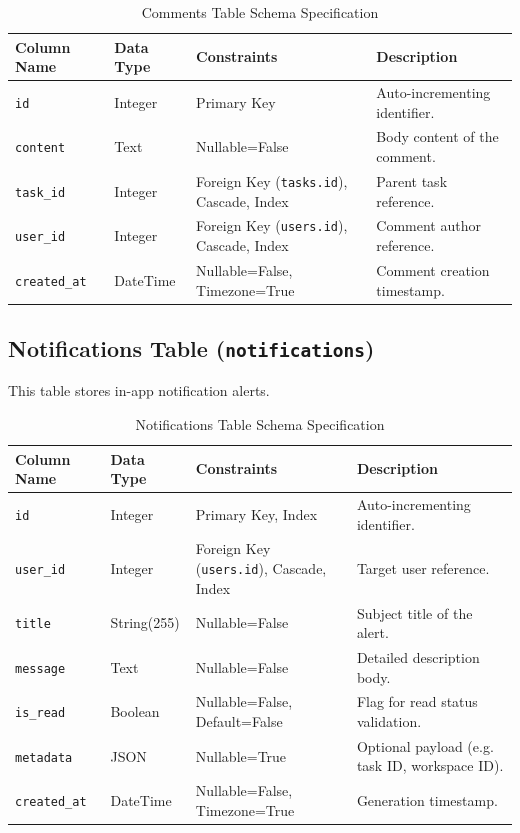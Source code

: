 \begin{table}[h!]
\centering
\small
\renewcommand{\arraystretch}{1.4}
\begin{tabularx}{\textwidth}{l l l X}
    \toprule[1.5pt]
    \rowcolor{primary!5}
    \textbf{\color{primary}Column Name} & \textbf{\color{primary}Data Type} & \textbf{\color{primary}Constraints} & \textbf{\color{primary}Description} \\
    \midrule
    \texttt{id} & Integer & Primary Key & Auto-incrementing identifier. \\
    \texttt{content} & Text & Nullable=False & Body content of the comment. \\
    \texttt{task\_id} & Integer & Foreign Key (\texttt{tasks.id}), Cascade, Index & Parent task reference. \\
    \texttt{user\_id} & Integer & Foreign Key (\texttt{users.id}), Cascade, Index & Comment author reference. \\
    \texttt{created\_at} & DateTime & Nullable=False, Timezone=True & Comment creation timestamp. \\
    \bottomrule[1.5pt]
\end{tabularx}
\caption{Comments Table Schema Specification}
\label{tab:comments_table}
\end{table}

\pagebreak
\subsection{Notifications Table (\texttt{notifications})}
This table stores in-app notification alerts.

\begin{table}[h!]
\centering
\small
\renewcommand{\arraystretch}{1.4}
\begin{tabularx}{\textwidth}{l l l X}
    \toprule[1.5pt]
    \rowcolor{primary!5}
    \textbf{\color{primary}Column Name} & \textbf{\color{primary}Data Type} & \textbf{\color{primary}Constraints} & \textbf{\color{primary}Description} \\
    \midrule
    \texttt{id} & Integer & Primary Key, Index & Auto-incrementing identifier. \\
    \texttt{user\_id} & Integer & Foreign Key (\texttt{users.id}), Cascade, Index & Target user reference. \\
    \texttt{title} & String(255) & Nullable=False & Subject title of the alert. \\
    \texttt{message} & Text & Nullable=False & Detailed description body. \\
    \texttt{is\_read} & Boolean & Nullable=False, Default=False & Flag for read status validation. \\
    \texttt{metadata} & JSON & Nullable=True & Optional payload (e.g. task ID, workspace ID). \\
    \texttt{created\_at} & DateTime & Nullable=False, Timezone=True & Generation timestamp. \\
    \bottomrule[1.5pt]
\end{tabularx}
\caption{Notifications Table Schema Specification}
\label{tab:notifications_table}
\end{table}

